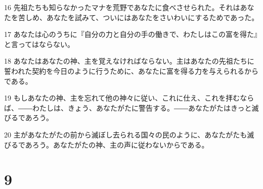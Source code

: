 \par 16 先祖たちも知らなかったマナを荒野であなたに食べさせられた。それはあなたを苦しめ、あなたを試みて、ついにはあなたをさいわいにするためであった。
\par 17 あなたは心のうちに『自分の力と自分の手の働きで、わたしはこの富を得た』と言ってはならない。
\par 18 あなたはあなたの神、主を覚えなければならない。主はあなたの先祖たちに誓われた契約を今日のように行うために、あなたに富を得る力を与えられるからである。
\par 19 もしあなたの神、主を忘れて他の神々に従い、これに仕え、これを拝むならば、――わたしは、きょう、あなたがたに警告する。――あなたがたはきっと滅びるであろう。
\par 20 主があなたがたの前から滅ぼし去られる国々の民のように、あなたがたも滅びるであろう。あなたがたの神、主の声に従わないからである。

\chapter{9}

